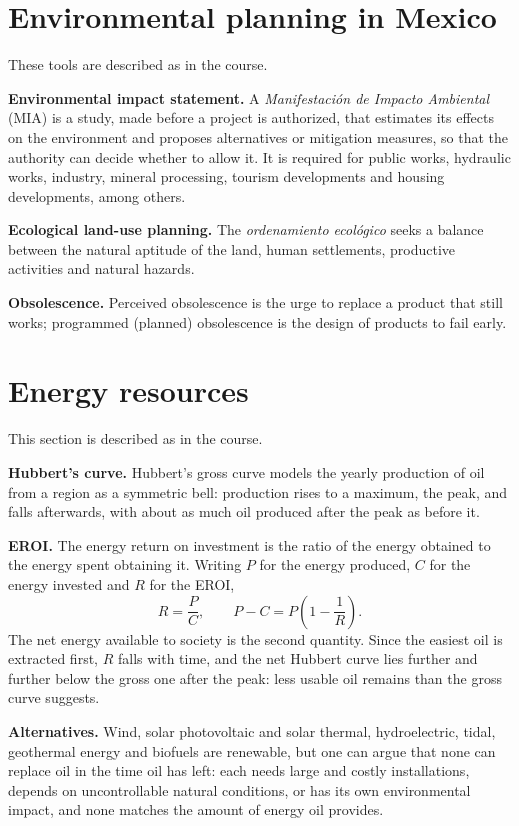 \section{Environmental planning in Mexico}
\label{section-planning}

These tools are described as in the course.

\textbf{Environmental impact statement.}
A \emph{Manifestaci\'on de Impacto Ambiental}
(MIA) is a study, made before a project is
authorized, that estimates its effects on
the environment and proposes alternatives
or mitigation measures, so that the
authority can decide whether to allow it.
It is required for public works, hydraulic
works, industry, mineral processing,
tourism developments and housing
developments, among others.

\textbf{Ecological land-use planning.}
The \emph{ordenamiento ecol\'ogico} seeks a
balance between the natural aptitude of the
land, human settlements, productive
activities and natural hazards.

\textbf{Obsolescence.}
Perceived obsolescence is the urge to
replace a product that still works;
programmed (planned) obsolescence is the
design of products to fail early.

\section{Energy resources}
\label{section-energy}

This section is described as in the course.

\textbf{Hubbert's curve.}
Hubbert's gross curve models the yearly
production of oil from a region as a
symmetric bell: production rises to a
maximum, the peak, and falls afterwards,
with about as much oil produced after the
peak as before it.

\textbf{EROI.}
The energy return on investment is the
ratio of the energy obtained to the energy
spent obtaining it. Writing $P$ for the
energy produced, $C$ for the energy
invested and $R$ for the EROI,
$$
R = \frac{P}{C}, \qquad
P - C = P\left(1 - \frac{1}{R}\right).
$$
The net energy available to society is the
second quantity. Since the easiest oil is
extracted first, $R$ falls with time, and
the net Hubbert curve lies further and
further below the gross one after the peak:
less usable oil remains than the gross curve
suggests.

\textbf{Alternatives.}
Wind, solar photovoltaic and solar thermal,
hydroelectric, tidal, geothermal energy and
biofuels are renewable, but one can
argue that none can replace oil in the
time oil has left: each needs large and
costly installations, depends on
uncontrollable natural conditions, or has
its own environmental impact, and none
matches the amount of energy oil provides.

